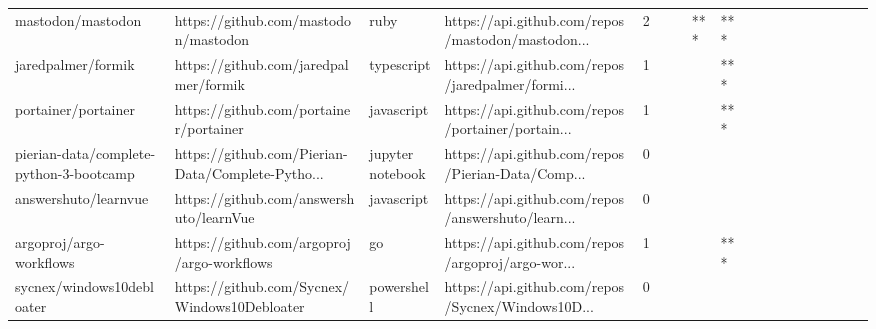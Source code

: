 \begin{tabular}{llllrlllllllllllll}
mastodon/mastodon                                  &               https://github.com/mastodon/mastodon &              ruby &  https://api.github.com/repos/mastodon/mastodon... &       2 &         &        &       *** &            *** &                 &        &           &           &          &          &       &              &          \\
jaredpalmer/formik                                 &              https://github.com/jaredpalmer/formik &        typescript &  https://api.github.com/repos/jaredpalmer/formi... &       1 &         &        &           &            *** &                 &        &           &           &          &          &       &              &          \\
portainer/portainer                                &             https://github.com/portainer/portainer &        javascript &  https://api.github.com/repos/portainer/portain... &       1 &         &        &           &            *** &                 &        &           &           &          &          &       &              &          \\
pierian-data/complete-python-3-bootcamp            &  https://github.com/Pierian-Data/Complete-Pytho... &  jupyter notebook &  https://api.github.com/repos/Pierian-Data/Comp... &       0 &         &        &           &                &                 &        &           &           &          &          &       &              &          \\
answershuto/learnvue                               &            https://github.com/answershuto/learnVue &        javascript &  https://api.github.com/repos/answershuto/learn... &       0 &         &        &           &                &                 &        &           &           &          &          &       &              &          \\
argoproj/argo-workflows                            &         https://github.com/argoproj/argo-workflows &                go &  https://api.github.com/repos/argoproj/argo-wor... &       1 &         &        &           &            *** &                 &        &           &           &          &          &       &              &          \\
sycnex/windows10debloater                          &       https://github.com/Sycnex/Windows10Debloater &        powershell &  https://api.github.com/repos/Sycnex/Windows10D... &       0 &         &        &           &                &                 &        &           &           &          &          &       &              &          \\

\end{tabular}
